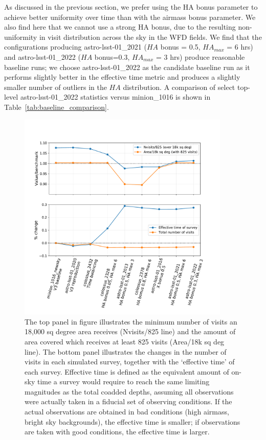 \documentclass[DM,lsstdraft,authoryear,toc]{lsstdoc}
\begin{document}
As discussed in the previous section, we prefer using the HA bonus parameter to achieve better uniformity over time than with the airmass bonus parameter. We also find here that we cannot use a strong HA bonus, due to the resulting non-uniformity in visit distribution across the sky in the WFD fields. We find that the configurations producing astro-lsst-01\_2021 ($HA$ bonus = 0.5, $HA_{max}$  = 6 hrs) and astro-lsst-01\_2022 ($HA$ bonus=0.3, $HA_{max}$ = 3 hrs) produce reasonable baseline runs; we choose astro-lsst-01\_2022 as the candidate baseline run as it performs slightly better in the effective time metric and produces a slightly smaller number of outliers in the $HA$ distribution.  A comparison of select top-level astro-lsst-01\_2022 statistics versus minion\_1016 is shown in Table~\ref{tab:baseline_comparison}. 

\begin{figure}[ht]
\centering
\includegraphics[width=0.9\textwidth]{figures/srd}
\caption{The top panel in figure illustrates the minimum number of visits an 18,000 sq degree area receives (Nvisits/825 line) and the amount of area covered which receives at least 825 visits (Area/18k sq deg line).  The bottom panel illustrates the changes in the number of visits in each simulated survey, together with the `effective time' of each survey. Effective time is defined as the equivalent amount of on-sky time a survey would require to reach the same limiting magnitudes as the total coadded depths, assuming all observations were actually taken in a fiducial set of observing conditions. If the actual observations are obtained in bad conditions (high airmass, bright sky backgrounds), the effective time is smaller; if observations are taken with good conditions, the effective time is larger.
\label{fig:srd}}
\end{figure}
\end{document}
